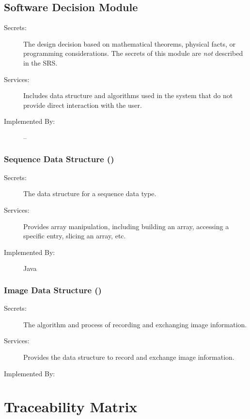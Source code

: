 \documentclass[12pt, titlepage]{article}
\begin{document}
\subsection{Software Decision Module}

\begin{description}
\item[Secrets:] The design decision based on mathematical theorems, physical
  facts, or programming considerations. The secrets of this module are
  \emph{not} described in the SRS.
\item[Services:] Includes data structure and algorithms used in the system that
  do not provide direct interaction with the user. 
\item[Implemented By:] --
\end{description}

\subsubsection{Sequence Data Structure ()}

\begin{description}
\item[Secrets:]The data structure for a sequence data type.
\item[Services:]Provides array manipulation, including building an array,
accessing a specific entry, slicing an array, etc.
\item[Implemented By:] Java
\end{description}

\subsubsection{Image Data Structure ()}

\begin{description}
\item[Secrets:]The algorithm and process of recording and exchanging image
information.
\item[Services:]Provides the data structure to record and exchange image
information.
\item[Implemented By:] \progname{}
\end{description}

\section{Traceability Matrix} \label{SecTM}
\end{document}
